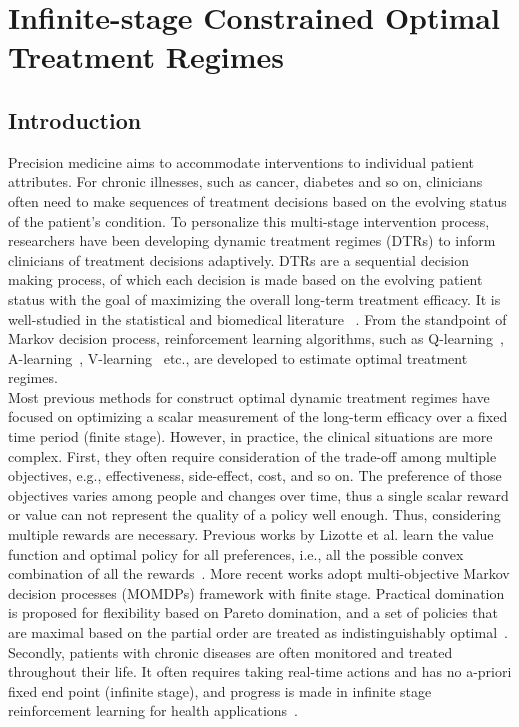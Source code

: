 \chapter{Infinite-stage Constrained Optimal Treatment Regimes}
\label{chap-four}
\section{Introduction}
Precision medicine aims to accommodate interventions to individual patient attributes. For chronic illnesses, such as cancer, diabetes and so on, clinicians often need to make sequences of treatment decisions based on the evolving status of the patient's condition. To personalize this multi-stage intervention process, researchers have been developing dynamic treatment regimes (DTRs) to inform clinicians of treatment decisions adaptively. DTRs are a sequential decision making process, of which each decision is made based on the evolving patient status with the goal of maximizing the overall long-term treatment efficacy. It is well-studied in the statistical and biomedical literature ~\cite{Murphy2003, Moodie2004,Murphy2005,Zhang2012, Laber2014,Linn2014}. From the standpoint of Markov decision process, reinforcement learning algorithms, such as Q-learning~\cite{Murphy2005}, A-learning~\cite{blatt2004learning}, V-learning~\cite{Luckett2016} etc., are developed to estimate optimal treatment regimes. \\

Most previous methods for construct optimal dynamic treatment regimes have focused on optimizing a scalar measurement of the long-term efficacy over a fixed time period (finite stage).  However, in practice, the clinical situations are more complex. First, they often require consideration of the trade-off among multiple objectives, e.g., effectiveness, side-effect, cost, and so on. The preference of those objectives varies among people and changes over time, thus a single scalar reward or value can not represent the quality of a policy well enough. Thus, considering multiple rewards are necessary. Previous works by Lizotte et al. learn the value function and optimal policy for all preferences, i.e., all the possible convex combination of all the rewards~\cite{Lizotte2010,Lizotte2012}. More recent works adopt multi-objective Markov decision processes (MOMDPs) framework with finite stage. Practical domination is proposed for flexibility based on Pareto domination, and a set of policies that are maximal based on the partial order are treated as indistinguishably optimal~\cite{LaberTwo2014, Lizotte2016}. Secondly, patients with chronic diseases are often monitored and treated throughout their life. It often requires taking real-time actions and has no a-priori fixed end point (infinite stage), and progress is made in infinite stage reinforcement learning for health applications~\cite{Ertefaie2014,Murphy2016,Luckett2016}.\\

